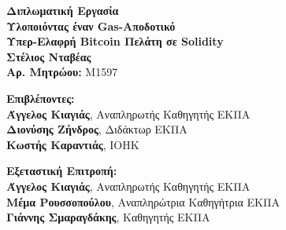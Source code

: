 \begin{center}
    \vspace{3cm}
    \large \textbf{Διπλωματική Εργασία}\\
    \vspace{3cm}
    \textbf{Υλοποιόντας έναν Gas-Αποδοτικό\\
    Υπερ-Ελαφρή Bitcoin Πελάτη σε Solidity}\\
    \vspace{3cm}
    \large \textbf{Στέλιος Νταβέας}\\
    \textbf{Αρ. Μητρώου:} M1597
    \vspace{5cm}
    \begin{flushleft}
        \textbf{Επιβλέποντες:}\\
        \hspace{2cm}
        \textbf{Άγγελος Κιαγιάς}, Αναπληρωτής Καθηγητής ΕΚΠΑ\\
        \hspace{2cm}
        \textbf{Διονύσης Ζήνδρος}, Διδάκτωρ ΕΚΠΑ\\
        \hspace{2cm}
        \textbf{Κωστής Καραντιάς}, IOHK



        \vspace{1cm}

        \textbf{Εξεταστική Επιτροπή:}\\
        \hspace{2cm}
        \textbf{Άγγελος Κιαγιάς}, Αναπληρωτής Καθηγητής ΕΚΠΑ\\
        \hspace{2cm}
        \textbf{Μέμα Ρουσσοπούλου}, Αναπληρώτρια Καθηγήτρια ΕΚΠΑ\\
        \hspace{2cm}
        \textbf{Γιάννης Σμαραγδάκης}, Καθηγητής ΕΚΠΑ

    \end{flushleft}
\end{center}

\pagebreak
